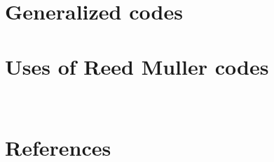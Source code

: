 \section{Generalized \rm codes}

\section {Uses of Reed Muller codes}

~\cite{codingtheory+blog}
\section {References}

      








